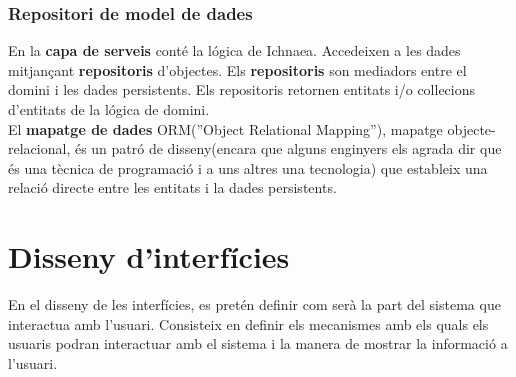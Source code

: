 \subsubsection{Repositori de model de dades}
En la \textbf{capa de serveis} cont\'{e} la l\'{o}gica de Ichnaea. Accedeixen a les dades mitjançant \textbf{repositoris} d'objectes. Els \textbf{repositoris} son mediadors entre el domini i les dades persistents. Els repositoris retornen entitats i/o collecions d'entitats de la l\'{ogica} de domini. \\

El \textbf{mapatge de dades} ORM(''Object Relational Mapping''), mapatge objecte-relacional, \'{e}s un patr\'{o} de disseny(encara que alguns enginyers els agrada dir que \'{e}s una tècnica de programaci\'{o} i a uns altres una tecnologia) que estableix una relaci\'{o} directe entre les entitats i la dades persistents.\cite{orm}

\section{Disseny d'interf\'{i}cies}
\label{sec:dessigninterfaces}
En el disseny de les interfícies, es pretén definir com serà la part del sistema que interactua amb l’usuari. Consisteix en definir els mecanismes amb els quals els usuaris podran interactuar amb el sistema i la manera de mostrar la informació a l’usuari.\\
